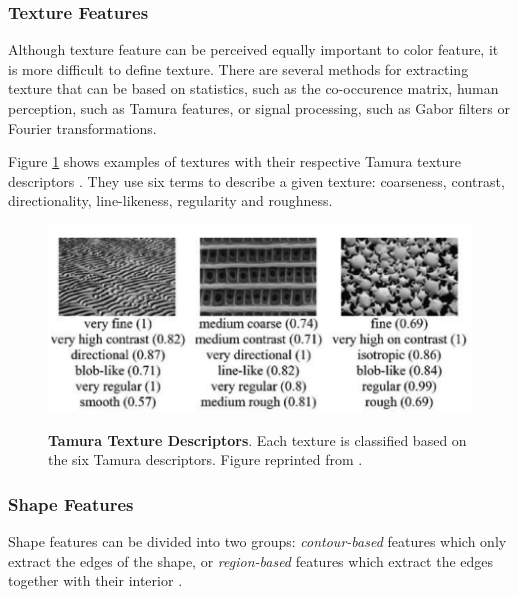 \documentclass[12pt]{report}
\begin{document}
\subsubsection{Texture Features}
Although texture feature can be perceived equally important to color feature, it is more difficult to define texture. There are several methods for extracting texture that can be based on statistics, such as the co-occurence matrix, human perception, such as Tamura features, or signal processing, such as Gabor filters or Fourier transformations.

Figure \ref{fig:texture_feat} shows examples of textures with their respective Tamura texture descriptors \cite{tamura1978textural}. They use six terms to describe a given texture: coarseness, contrast, directionality, line-likeness, regularity and roughness. 

\begin{figure}[h]
\centering
{\includegraphics[width=0.7\linewidth]{02_background/CBIR/texture_features}}
\caption{\label{fig:texture_feat} \textbf{Tamura Texture Descriptors}. Each texture is classified based on the six Tamura descriptors. Figure reprinted from \cite{LIN20032255}.}
\end{figure}


\subsubsection{Shape Features}
Shape features can be divided into two groups: \textit{contour-based} features which only extract the edges of the shape, or \textit{region-based} features which extract the edges together with their interior \cite{zhang2004review}.

\end{document}
